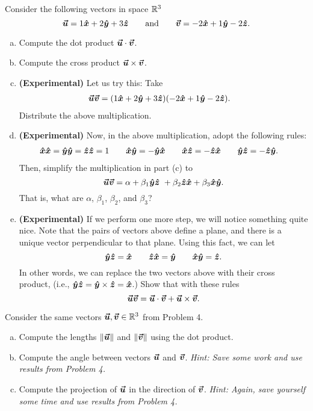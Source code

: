 \documentclass[12pt]{article} %
\begin{document}
\begin{problem}
Consider the following vectors in space $\mathbb{R}^3$
\[
\boldsymbol{\vec{u}} = 1\boldsymbol{\hat{x}} + 2\boldsymbol{\hat{y}} + 3\boldsymbol{\hat{z}} \qquad \textrm{and} \qquad \boldsymbol{\vec{v}} = -2\boldsymbol{\hat{x}} +1\boldsymbol{\hat{y}} -2\boldsymbol{\hat{z}}.
\]
\begin{enumerate}[(a)]
    \item Compute the dot product $\boldsymbol{\vec{u}}\cdot \boldsymbol{\vec{v}}$. 
    \item Compute the cross product $\boldsymbol{\vec{u}} \times \boldsymbol{\vec{v}}$.
    \item \textbf{(Experimental)} Let us try this: Take
    \begin{align*}
        \boldsymbol{\vec{u}} \boldsymbol{\vec{v}} &= (1\boldsymbol{\hat{x}} + 2\boldsymbol{\hat{y}} + 3\boldsymbol{\hat{z}})(-2\boldsymbol{\hat{x}} + 1\boldsymbol{\hat{y}} -2\boldsymbol{\hat{z}}).
    \end{align*}
    Distribute the above multiplication.
    \item \textbf{(Experimental)} Now, in the above multiplication, adopt the following rules:
    \begin{align*}
        \boldsymbol{\hat{x}} \boldsymbol{\hat{x}} = \boldsymbol{\hat{y}} \boldsymbol{\hat{y}} = \boldsymbol{\hat{z}} \boldsymbol{\hat{z}} &= 1 &&&
        \boldsymbol{\hat{x}} \boldsymbol{\hat{y}} &= - \boldsymbol{\hat{y}} \boldsymbol{\hat{x}} &&& \boldsymbol{\hat{x}} \boldsymbol{\hat{z}} &= - \boldsymbol{\hat{z}} \boldsymbol{\hat{x}} &&& \boldsymbol{\hat{y}} \boldsymbol{\hat{z}} &= -\boldsymbol{\hat{z}} \boldsymbol{\hat{y}}.
    \end{align*}
    Then, simplify the multiplication in part (c) to
    \[
    \vecu\vecv = \alpha + \beta_1 \yhat\zhat  \ + \beta_2 \zhat \xhat + \beta_3 \xhat \yhat. 
    \]
    That is, what are $\alpha$, $\beta_1$, $\beta_2$, and $\beta_3$?
    \item \textbf{(Experimental)} If we perform one more step, we will notice something quite nice.  Note that the pairs of vectors above define a plane, and there is a unique vector perpendicular to that plane.  Using this fact, we can let 
    \[
    \boldsymbol{\hat{y}} \boldsymbol{\hat{z}} = \boldsymbol{\hat{x}} \qquad \boldsymbol{\hat{z}} \boldsymbol{\hat{x}} = \boldsymbol{\hat{y}} \qquad \boldsymbol{\hat{x}} \boldsymbol{\hat{y}} = \boldsymbol{\hat{z}}.
    \]
    In other words, we can replace the two vectors above with their cross product, (i.e., $\boldsymbol{\hat{y}} \boldsymbol{\hat{z}} = \boldsymbol{\hat{y}} \times \boldsymbol{\hat{z}} = \boldsymbol{\hat{x}}$.) Show that with these rules
    \[
    \boldsymbol{\vec{u}} \boldsymbol{\vec{v}} = \boldsymbol{\vec{u}}\cdot \boldsymbol{\vec{v}} + \boldsymbol{\vec{u}} \times \boldsymbol{\vec{v}}.
    \]
\end{enumerate}
\end{problem}

\begin{problem}
Consider the same vectors $\boldsymbol{\vec{u}},\boldsymbol{\vec{v}}\in \mathbb{R}^3$ from Problem 4.  
\begin{enumerate}[(a)]
    \item Compute the lengths $\|\boldsymbol{\vec{u}}\|$ and $\|\boldsymbol{\vec{v}}\|$ using the dot product.
    \item Compute the angle between vectors $\boldsymbol{\vec{u}}$ and $\boldsymbol{\vec{v}}$. \emph{Hint: Save some work and use results from Problem 4.}
    \item Compute the projection of $\boldsymbol{\vec{u}}$ in the direction of $\boldsymbol{\vec{v}}$. \emph{Hint: Again, save yourself some time and use results from Problem 4.}
\end{enumerate}
\end{problem}
\end{document}

